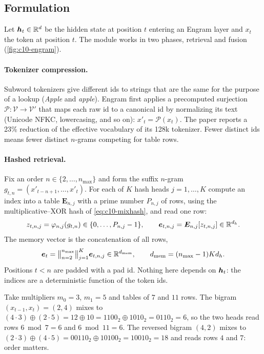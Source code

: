 \subsection{Formulation}

Let $\bm{h}_t \in \mathbb{R}^{d}$ be the hidden state at position $t$ entering an Engram layer and $x_t$ the
token at position $t$. The module works in two phases, retrieval and fusion
(\cref{fig:c10-engram}).

\paragraph{Tokenizer compression.} Subword tokenizers give different ids to strings that are the
same for the purpose of a lookup (\emph{Apple} and \emph{\textvisiblespace apple}). Engram first
applies a precomputed surjection $\mathcal{P} : \mathcal{V} \to \mathcal{V}'$ that maps each raw id
to a canonical id by normalizing its text (Unicode NFKC, lowercasing, and so on):
$x'_t = \mathcal{P}(x_t)$. The paper reports a 23\% reduction of the effective vocabulary of its
128k tokenizer. Fewer distinct ids means fewer distinct $n$-grams competing for table rows.

\paragraph{Hashed retrieval.} Fix an order $n \in \{2,\dots,n_{\max}\}$ and form the suffix
$n$-gram $g_{t,n} = (x'_{t-n+1},\dots,x'_t)$. For each of $K$ hash heads $j = 1,\dots,K$ compute an index
into a table $\bm{E}_{n,j}$ with a prime number $P_{n,j}$ of rows, using the multiplicative--XOR hash
of \cref{eq:c10-mixhash}, and read one row:
\begin{equation}
  z_{t,n,j} = \varphi_{n,j}(g_{t,n}) \in \{0,\dots,P_{n,j}-1\},\qquad
  \bm{e}_{t,n,j} = \bm{E}_{n,j}[z_{t,n,j}] \in \mathbb{R}^{d_h} .
  \label{eq:c10-engram-lookup}
\end{equation}
The memory vector is the concatenation of all rows,
\begin{equation}
  \bm{e}_t = \big\Vert_{n=2}^{n_{\max}} \big\Vert_{j=1}^{K} \bm{e}_{t,n,j} \in \mathbb{R}^{d_{\mathrm{mem}}},
  \qquad d_{\mathrm{mem}} = (n_{\max}-1) K d_h .
  \label{eq:c10-engram-concat}
\end{equation}
Positions $t < n$ are padded with a pad id. Nothing here depends on $\bm{h}_t$: the indices are a
deterministic function of the token ids.

\begin{example}
Take multipliers $m_0 = 3$, $m_1 = 5$ and tables of $7$ and $11$ rows. The bigram $(x_{t-1}, x_t) =
(2, 4)$ mixes to $(4 \cdot 3) \oplus (2 \cdot 5) = 12 \oplus 10 = 1100_2 \oplus 1010_2 = 0110_2 = 6$,
so the two heads read rows $6 \bmod 7 = 6$ and $6 \bmod 11 = 6$. The reversed bigram $(4, 2)$ mixes
to $(2\cdot 3) \oplus (4 \cdot 5) = 00110_2 \oplus 10100_2 = 10010_2 = 18$ and reads rows $4$ and
$7$: order matters.
\end{example}

